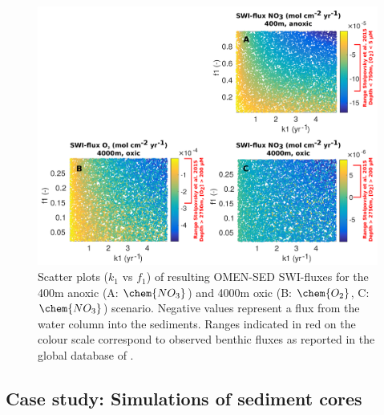 \documentclass[gmd, manuscript]{copernicus}
\begin{document}
\begin{figure}[tbp]
\begin{center}
	\includegraphics[width=1.0\textwidth]{figures/SA/k1_vs_f1_SWIflux_COMBINED_1604.pdf}
	\caption{Scatter plots ($k_1$ vs $f_1$) of resulting OMEN-SED SWI-fluxes for the 400m anoxic (A: $\chem{NO_3}$) and 4000m oxic (B: $\chem{O_2}$, C: $\chem{NO_3}$) scenario. 
	Negative values represent a flux from the water column into the sediments.
	Ranges indicated in red on the colour scale correspond to observed benthic fluxes as reported in the global database of \citet{stolpovsky_toward_2015}. 
}\label{fig:SA_Color_ScatterPlots}
\end{center}
\end{figure}


\subsection{Case study: Simulations of sediment cores}\label{subsec:SedProfiles}
\end{document}

